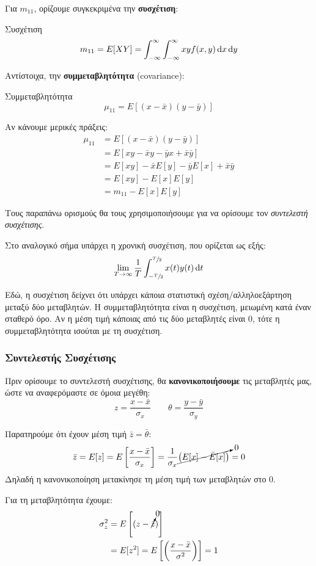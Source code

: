 \documentclass[11pt,a4paper,notitlepage,fleqn,draft]{article}
\begin{document}
Για \( m_{11} \), ορίζουμε συγκεκριμένα την \textbf{συσχέτιση}:
\begin{defn}{Συσχέτιση}{}
	\[
	m_{11} = E[XY] = \int_{-\infty}^{\infty} \int_{-\infty}^{\infty}
	xy f(x,y)\mathop{}\!\mathrm{d} x \mathop{}\!\mathrm{d} y
	\]
\end{defn}

Αντίστοιχα, την \textbf{συμμεταβλητότητα} (covariance):
\begin{defn}{Συμμεταβλητότητα}{}
	\[
	\mu_{11} = E\left[
	(x-\bar x)(y-\bar y)
	\right]
	\]
\end{defn}

Αν κάνουμε μερικές πράξεις:
\begin{align*}
	\mu_{11} &= E\left[(x-\bar x)(y-\bar y)\right] \\
	&= E[xy-\bar x y-\bar y x +\bar x\bar y] \\
	&= E[xy]-\bar xE[y]-\bar y E[x] +\bar x \bar y \\
	&= E[xy] - E[x]E[y] \\
	&= m_{11} - E[x]E[y]
\end{align*}

Τους παραπάνω ορισμούς θα τους χρησιμοποιήσουμε για να ορίσουμε τον
\textit{συντελεστή συσχέτισης}.

Στο αναλογικό σήμα υπάρχει η χρονική συσχέτιση, που ορίζεται ως εξής:
\[
\lim_{T\to \infty} \frac{1}{T} \int_{-\sfrac{T}{2} }^{\sfrac{T}{2} }
x(t)y(t)\mathop{}\!\mathrm{d} t
\]

Εδώ, η συσχέτιση δείχνει ότι υπάρχει κάποια στατιστική
σχέση/αλληλοεξάρτηση μεταξύ δύο μεταβλητών. Η συμμεταβλητότητα είναι
η συσχέτιση, μειωμένη κατά έναν σταθερό όρο. Αν η μέση τιμή κάποιας
από τις δύο μεταβλητές είναι 0, τότε η συμμεταβλητότητα ισούται με τη
συσχέτιση.

\subsubsection{Συντελεστής Συσχέτισης}

Πριν ορίσουμε το συντελεστή συσχέτισης, θα \textbf{κανονικοποιήσουμε}
τις μεταβλητές μας, ώστε να αναφερόμαστε σε όμοια μεγέθη:
\[
z=\frac{x-\bar x}{\sigma_x}
\qquad \theta = \frac{y-\bar y}{\sigma_y}
\]

Παρατηρούμε ότι έχουν μέση τιμή \( \bar z=\bar \theta \):
\[
\bar z = E[z]=E\left[\frac{x-\bar x}{\sigma_x}\right]
= \frac{1}{\sigma_x}\cancelto{0}{\left(E[x]-\bar E[x]\right)} = 0
\]
Δηλαδή η κανονικοποίηση μετακίνησε τη μέση τιμή των μεταβλητών στο 0.

Για τη μεταβλητότητα έχουμε:
\begin{align*}
\sigma_z^2 &= E\left[(z-\cancelto{0}{\bar z})\right]
\\ &= E[z^2] = E\left[\left(\frac{x-\bar x}{\sigma^2}\right)\right]
= 1
\end{align*}
\end{document}
